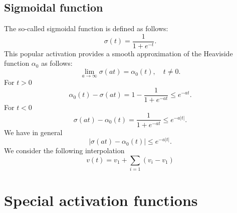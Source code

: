 \subsection{Sigmoidal function}
The so-called sigmoidal function is defined as follows:
\begin{equation}
  \label{sigmoidal}
\sigma(t) = \frac{1}{1 + e^{-t}}.  
\end{equation}
This popular activation provides a smooth approximation of the Heaviside function $\alpha_0$ as follows:
\begin{equation}
  \label{sig}
\lim_{a\to \infty}\sigma(at) = \alpha_0(t), \quad t\neq 0.
\end{equation}
For $t>0$
$$
\alpha_0(t)- \sigma(at)
=1-\frac{1}{1+e^{-at}}\le e^{-at}.
$$
For $t<0$
$$
\sigma(at)-\alpha_0(t)
=\frac{1}{1+e^{-at}}\le e^{-a|t|}.
$$
We have in general 
$$
|\sigma(at)-\alpha_0(t)|
\le e^{-a|t|}.
$$
We consider the following interpolation 
\begin{equation}
  \label{interp0-1}
v(t)=v_1+\sum_{i=1}  (v_i-v_1)
\end{equation}



\section{Special activation functions}

